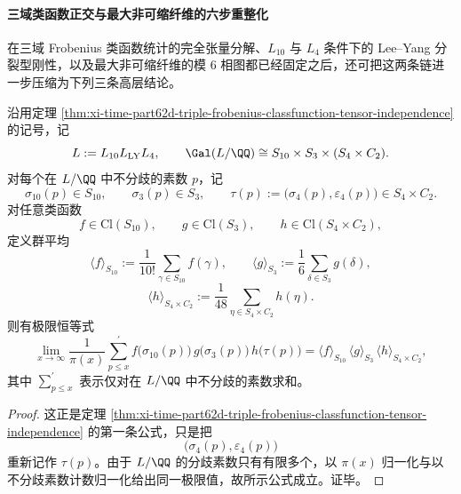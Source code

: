 \paragraph{三域类函数正交与最大非可缩纤维的六步重整化}
在三域 Frobenius 类函数统计的完全张量分解、\(L_{10}\) 与 \(L_4\) 条件下的 Lee--Yang 分裂型刚性，以及最大非可缩纤维的模 \(6\) 相图都已经固定之后，还可把这两条链进一步压缩为下列三条高层结论。

\begin{theorem}\label{thm:xi-time-part62di-triple-classfunction-chebotarev-factorization}
沿用定理 \ref{thm:xi-time-part62d-triple-frobenius-classfunction-tensor-independence} 的记号，记
\[
L:=L_{10}L_{\mathrm{LY}}L_4,
\qquad
\Gal(L/\QQ)\cong S_{10}\times S_3\times (S_4\times C_2).
\]
对每个在 \(L/\QQ\) 中不分歧的素数 \(p\)，记
\[
\sigma_{10}(p)\in S_{10},
\qquad
\sigma_3(p)\in S_3,
\qquad
\tau(p):=\bigl(\sigma_4(p),\varepsilon_4(p)\bigr)\in S_4\times C_2.
\]
对任意类函数
\[
f\in \mathrm{Cl}(S_{10}),
\qquad
g\in \mathrm{Cl}(S_3),
\qquad
h\in \mathrm{Cl}(S_4\times C_2),
\]
定义群平均
\[
\langle f\rangle_{S_{10}}:=\frac{1}{10!}\sum_{\gamma\in S_{10}}f(\gamma),
\qquad
\langle g\rangle_{S_3}:=\frac{1}{6}\sum_{\delta\in S_3}g(\delta),
\]
\[
\langle h\rangle_{S_4\times C_2}:=
\frac{1}{48}\sum_{\eta\in S_4\times C_2}h(\eta).
\]
则有极限恒等式
\[
\lim_{x\to\infty}\frac{1}{\pi(x)}
\sum_{p\le x}^{\prime}
f\!\bigl(\sigma_{10}(p)\bigr)\,
g\!\bigl(\sigma_3(p)\bigr)\,
h\!\bigl(\tau(p)\bigr)
=
\langle f\rangle_{S_{10}}\,
\langle g\rangle_{S_3}\,
\langle h\rangle_{S_4\times C_2},
\]
其中 \(\sum_{p\le x}^{\prime}\) 表示仅对在 \(L/\QQ\) 中不分歧的素数求和。
\end{theorem}
\begin{proof}
这正是定理 \ref{thm:xi-time-part62d-triple-frobenius-classfunction-tensor-independence} 的第一条公式，只是把
\[
\bigl(\sigma_4(p),\varepsilon_4(p)\bigr)
\]
重新记作 \(\tau(p)\)。由于 \(L/\QQ\) 的分歧素数只有有限多个，以 \(\pi(x)\) 归一化与以不分歧素数计数归一化给出同一极限值，故所示公式成立。证毕。
\end{proof}

